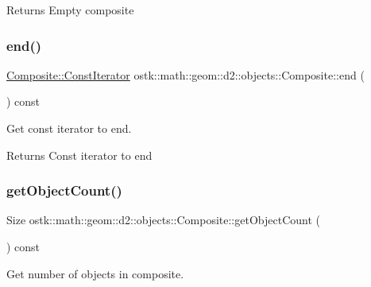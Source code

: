 \begin{DoxyReturn}{Returns}
Empty composite 
\end{DoxyReturn}
\mbox{\label{classostk_1_1math_1_1geom_1_1d2_1_1objects_1_1_composite_a223a51dd57b2c15a9e3894b61416473c}} 
\subsubsection{\texorpdfstring{end()}{end()}}
{\footnotesize\ttfamily \hyperlink{classostk_1_1math_1_1geom_1_1d2_1_1objects_1_1_composite_a848b806da9977737e1b100c1b51b39d9}{Composite\+::\+Const\+Iterator} ostk\+::math\+::geom\+::d2\+::objects\+::\+Composite\+::end (\begin{DoxyParamCaption}{ }\end{DoxyParamCaption}) const}



Get const iterator to end. 

\begin{DoxyReturn}{Returns}
Const iterator to end 
\end{DoxyReturn}
\mbox{\label{classostk_1_1math_1_1geom_1_1d2_1_1objects_1_1_composite_afce3755e061f325a15e0efb8eb214220}} 
\subsubsection{\texorpdfstring{get\+Object\+Count()}{getObjectCount()}}
{\footnotesize\ttfamily Size ostk\+::math\+::geom\+::d2\+::objects\+::\+Composite\+::get\+Object\+Count (\begin{DoxyParamCaption}{ }\end{DoxyParamCaption}) const}



Get number of objects in composite. 

